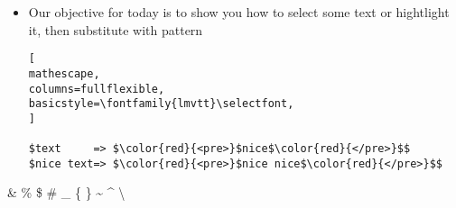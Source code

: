 \documentclass{article}
\begin{document}
\begin{itemize}
\item Our objective for today is to show you how to select some text or hightlight it, then substitute with pattern
\begin{lstlisting}[
mathescape,
columns=fullflexible,
basicstyle=\fontfamily{lmvtt}\selectfont,
]

$text     => $\color{red}{<pre>}$nice$\color{red}{</pre>}$$
$nice text=> $\color{red}{<pre>}$nice nice$\color{red}{</pre>}$$
\end{lstlisting} 
\end{itemize}

\& \% \$ \# \_ \{ \}
\textasciitilde
\textasciicircum
\textbackslash 
\end{document}
